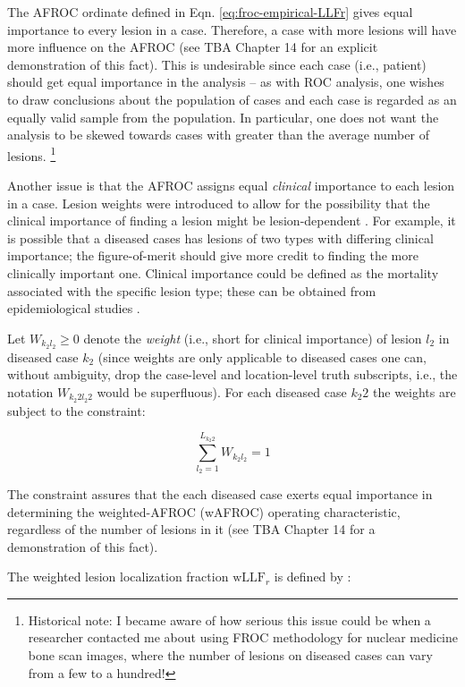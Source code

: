 \documentclass[
]{book}
\begin{document}
The AFROC ordinate defined in Eqn. \eqref{eq:froc-empirical-LLFr} gives equal importance to every lesion in a case. Therefore, a case with more lesions will have more influence on the AFROC (see TBA Chapter 14 for an explicit demonstration of this fact). This is undesirable since each case (i.e., patient) should get equal importance in the analysis -- as with ROC analysis, one wishes to draw conclusions about the population of cases and each case is regarded as an equally valid sample from the population. In particular, one does not want the analysis to be skewed towards cases with greater than the average number of lesions. \footnote{Historical note: I became aware of how serious this issue could be when a researcher contacted me about using FROC methodology for nuclear medicine bone scan images, where the number of lesions on diseased cases can vary from a few to a hundred!}

Another issue is that the AFROC assigns equal \emph{clinical} importance to each lesion in a case. Lesion weights were introduced \citep{RN1385} to allow for the possibility that the clinical importance of finding a lesion might be lesion-dependent \citep{RN1966}. For example, it is possible that a diseased cases has lesions of two types with differing clinical importance; the figure-of-merit should give more credit to finding the more clinically important one. Clinical importance could be defined as the mortality associated with the specific lesion type; these can be obtained from epidemiological studies \citep{desantis2011breast}.

Let \(W_{k_2 l_2} \geq 0\) denote the \emph{weight} (i.e., short for clinical importance) of lesion \(l_2\) in diseased case \(k_2\) (since weights are only applicable to diseased cases one can, without ambiguity, drop the case-level and location-level truth subscripts, i.e., the notation \(W_{k_2 2 l_2 2}\) would be superfluous). For each diseased case \(k_2 2\) the weights are subject to the constraint:

\begin{equation}
\sum_{l_2 =1 }^{L_{k_2 2}} W_{k_2 l_2} = 1
\label{eq:froc-empirical-weights-constraint}
\end{equation}

The constraint assures that the each diseased case exerts equal importance in determining the weighted-AFROC (wAFROC) operating characteristic, regardless of the number of lesions in it (see TBA Chapter 14 for a demonstration of this fact).

The weighted lesion localization fraction \(\text{wLLF}_r\) is defined by \citep{RN2484}:
\end{document}
